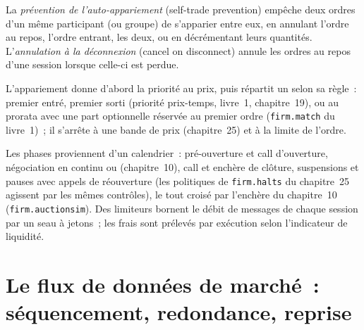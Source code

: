 \begin{definition}\label{def:mx:build-a-matching-engine-and-exchange-simulator:stp}
La \emph{prévention de l'auto-appariement} (self-trade prevention) empêche deux ordres d'un même participant (ou groupe) de s'apparier entre eux, en annulant
l'ordre au repos, l'ordre entrant, les deux, ou en décrémentant leurs quantités. L'\emph{annulation à la déconnexion} (cancel on disconnect) annule les ordres au repos d'une session
lorsque celle-ci est perdue.
\end{definition}

L'appariement donne d'abord la priorité au prix, puis répartit un  selon sa règle~: premier entré, premier sorti (priorité prix-temps, livre~1, chapitre~19), ou au prorata avec une
part optionnelle réservée au premier ordre (\texttt{firm.match} du livre~1)~; il s'arrête à une bande de prix (chapitre~25) et à la limite de l'ordre.

\label{lst:mx:build-a-matching-engine-and-exchange-simulator:match}

Les phases proviennent d'un calendrier~: pré-ouverture et call d'ouverture, négociation en continu ou  (chapitre~10), call et enchère de clôture, suspensions et
pauses avec appels de réouverture (les politiques de \texttt{firm.halts} du chapitre~25 agissent par les mêmes contrôles), le tout croisé par l'enchère du chapitre~10
(\texttt{firm.auctionsim}). Des limiteurs bornent le débit de messages de chaque session par un seau à jetons~; les frais sont prélevés par exécution selon l'indicateur de liquidité.

\section{Le flux de données de marché~: séquencement, redondance, reprise}

